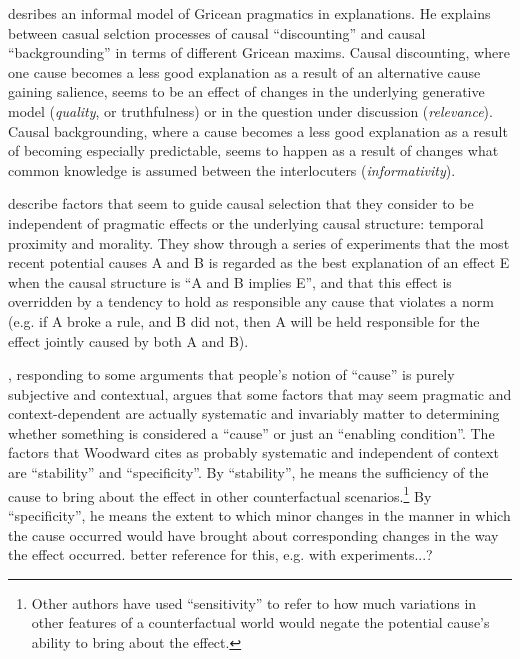 \documentclass[10pt,letterpaper]{article}
\newcommand{\todo}[1]{{\color{red}#1}}
\begin{document}
 desribes an informal model of Gricean pragmatics in explanations.
He explains between casual selction processes of causal ``discounting'' and causal ``backgrounding'' in terms of different Gricean maxims.
Causal discounting, where one cause becomes a less good explanation as a result of an alternative cause gaining salience, seems to be an effect of changes in the underlying generative model (\emph{quality}, or truthfulness) or in the question under discussion (\emph{relevance}).
Causal backgrounding, where a cause becomes a less good explanation as a result of becoming especially predictable, seems to happen as a result of changes what common knowledge is assumed between the interlocuters (\emph{informativity}).

 describe factors that seem to guide causal selection that they consider to be independent of pragmatic effects or the underlying causal structure: temporal proximity and morality. They show through a series of experiments that the most recent potential causes A and B is regarded as the best explanation of an effect E when the causal structure is ``A and B implies E'', and that this effect is overridden by a tendency to hold as responsible any cause that violates a norm (e.g. if A broke a rule, and B did not, then A will be held responsible for the effect jointly caused by both A and B).

, responding to some arguments that people's notion of ``cause'' is purely subjective and contextual, argues that some factors that may seem pragmatic and context-dependent are actually systematic and invariably matter to determining whether something is considered a ``cause'' or just an ``enabling condition''.
The factors that Woodward cites as probably systematic and independent of context are ``stability'' and ``specificity''.
By ``stability'', he means the sufficiency of the cause to bring about the effect in other counterfactual scenarios.\footnote{
Other authors have used ``sensitivity'' to refer to how much variations in other features of a counterfactual world would negate the potential cause's ability to bring about the effect.
}
By ``specificity'', he means the extent to which minor changes in the manner in which the cause occurred would have brought about corresponding changes in the way the effect occurred.
\todo{better reference for this, e.g. with experiments...?}
\end{document}
